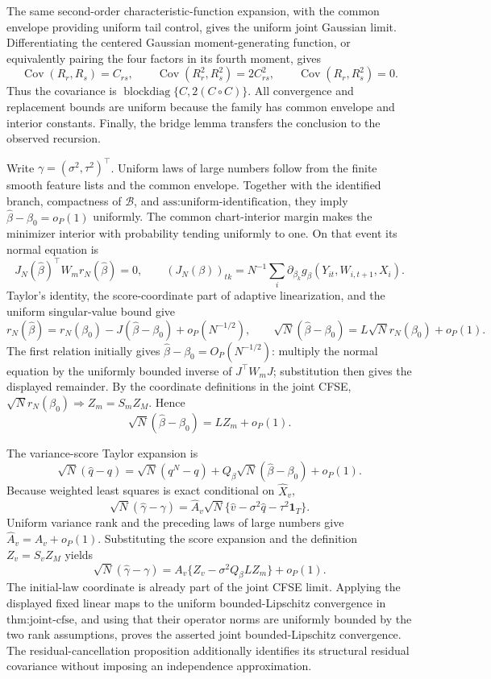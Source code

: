 The same second-order characteristic-function expansion, with the common envelope providing uniform tail control, gives the uniform joint Gaussian limit.  Differentiating the centered Gaussian moment-generating function, or equivalently pairing the four factors in its fourth moment, gives
\[
 \operatorname{Cov}(R_r,R_s)=C_{rs},\qquad
 \operatorname{Cov}(R_r^2,R_s^2)=2C_{rs}^2,
 \qquad
 \operatorname{Cov}(R_r,R_s^2)=0.
\]
Thus the covariance is \(\operatorname{blockdiag}\{C,2(C\circ C)\}\).  All convergence and replacement bounds are uniform because the family has common envelope and interior constants.  Finally, the bridge lemma transfers the conclusion to the observed recursion.

Write \(\gamma=(\sigma^2,\tau^2)^{\top}\).  Uniform laws of large numbers follow from the finite smooth feature lists and the common envelope.  Together with the identified branch, compactness of \(\mathcal B\), and \(\text{ass:uniform-identification}\), they imply \(\widehat\beta-\beta_0=o_P(1)\) uniformly.  The common chart-interior margin makes the minimizer interior with probability tending uniformly to one.  On that event its normal equation is
\[
 J_N(\widehat\beta)^{\top}W_mr_N(\widehat\beta)=0,
 \qquad (J_N(\beta))_{tk}=N^{-1}\sum_i\partial_{\beta_k}g_\beta(Y_{it},W_{i,t+1},X_i).
\]
Taylor's identity, the score-coordinate part of adaptive linearization, and the uniform singular-value bound give
\[
 r_N(\widehat\beta)=r_N(\beta_0)-J(\widehat\beta-\beta_0)+o_P(N^{-1/2}),
 \qquad
 \sqrt N(\widehat\beta-\beta_0)=L\sqrt N r_N(\beta_0)+o_P(1).
\]
The first relation initially gives \(\widehat\beta-\beta_0=O_P(N^{-1/2})\): multiply the normal equation by the uniformly bounded inverse of \(J^{\top}W_mJ\); substitution then gives the displayed remainder.  By the coordinate definitions in the joint CFSE, \(\sqrt Nr_N(\beta_0)\Rightarrow Z_m=S_mZ_M\).  Hence
\[
 \sqrt N(\widehat\beta-\beta_0)=LZ_m+o_P(1).
\]

The variance-score Taylor expansion is
\[
 \sqrt N(\widehat q-q)=\sqrt N(q^N-q)+Q_\beta\sqrt N(\widehat\beta-\beta_0)+o_P(1).
\]
Because weighted least squares is exact conditional on \(\widehat X_v\),
\[
 \sqrt N(\widehat\gamma-\gamma)
 =\widehat A_v\sqrt N\{\widehat v-\sigma^2\widehat q-\tau^2\mathbf1_T\}.
\]
Uniform variance rank and the preceding laws of large numbers give \(\widehat A_v=A_v+o_P(1)\).  Substituting the score expansion and the definition \(Z_v=S_vZ_M\) yields
\[
 \sqrt N(\widehat\gamma-\gamma)
 =A_v\{Z_v-\sigma^2Q_\beta LZ_m\}+o_P(1).
\]
The initial-law coordinate is already part of the joint CFSE limit.  Applying the displayed fixed linear maps to the uniform bounded-Lipschitz convergence in \(\text{thm:joint-cfse}\), and using that their operator norms are uniformly bounded by the two rank assumptions, proves the asserted joint bounded-Lipschitz convergence.  The residual-cancellation proposition additionally identifies its structural residual covariance without imposing an independence approximation.

